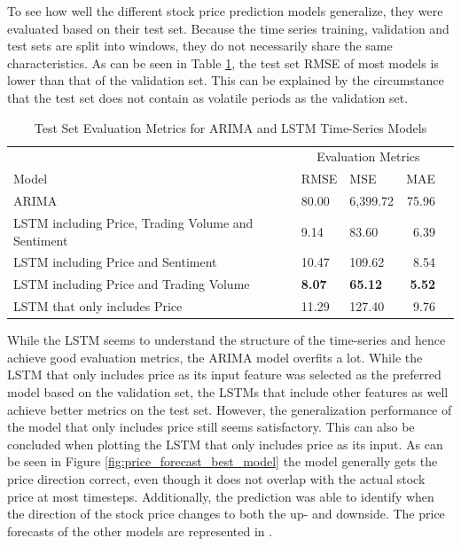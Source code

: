 \documentclass[11pt, a4paper]{article}
\begin{document}
To see how well the different stock price prediction models generalize, they were evaluated based on their test set.
Because the time series training, validation and test sets are split into windows, they do not necessarily share the same
characteristics. As can be seen in Table \ref{tab:results_stocks}, the test set RMSE of most models is lower than that of the
validation set. This can be explained by the circumstance that the test set does not contain as volatile periods as the
validation set.

\begin{table}[!h]
    \caption{Test Set Evaluation Metrics for ARIMA and LSTM Time-Series Models}
    \label{tab:results_stocks}
    \centering
    \small

    \begin{tabular}{lllrr}
        \toprule
                                        & \multicolumn{3}{c}{Evaluation Metrics} \\
                                        \cmidrule{2-4}
                            Model       & RMSE      & MSE     & MAE    \\
            \midrule
            \multirow{1}{*}{ARIMA}         & 80.00          & 6,399.72          & 75.96 \\
            \midrule
            \multirow{1}{*}{LSTM including Price, Trading Volume and Sentiment}       & 9.14          & 83.60          & 6.39 \\
            \midrule
            \multirow{1}{*}{LSTM including Price and Sentiment}       & 10.47          & 109.62          & 8.54 \\
            \midrule
            \multirow{1}{*}{LSTM including Price and Trading Volume}      & \textbf{8.07}           & \textbf{65.12}          & \textbf{5.52} \\
            \midrule
            \multirow{1}{*}{LSTM that only includes Price}      & 11.29         & 127.40          & 9.76 \\

        \bottomrule
    \end{tabular}

\end{table}

While the LSTM seems to understand the structure of the time-series and hence achieve good evaluation metrics, the ARIMA model
overfits a lot. While the LSTM that only includes price as its input feature was selected as the preferred model based on the
validation set, the LSTMs that include other features as well achieve better metrics on the test set. However, the generalization
performance of the model that only includes price still seems satisfactory.
This can also be concluded when plotting the LSTM that only includes price as its input.
As can be seen in Figure \ref{fig:price_forecast_best_model} the model generally gets the price direction correct, even though it does not
overlap with the actual stock price at most timesteps.
Additionally, the prediction was able to identify when the direction of the stock price changes to both the up- and downside.
The price forecasts of the other models are represented in .
\end{document}
